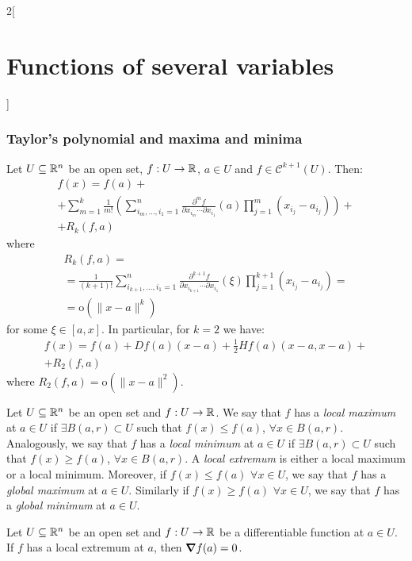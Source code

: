 \documentclass[../../../main.tex]{subfiles}
\begin{document}
\begin{multicols}{2}[\section{Functions of several variables}]
  \subsubsection{Taylor's polynomial and maxima and minima}
  \begin{theorem}
    Let $U\subseteq\mathbb{R}^n$ be an open set, $f:U\rightarrow\mathbb{R} $, $a\in U$ and $f\in \mathcal{C}^{k+1}(U)$. Then:
    \begin{multline*}
      f(x)=f(a)+\\+\sum_{m=1}^k\frac{1}{m!}\left(\sum_{i_m,\ldots,i_1=1}^n\frac{\partial^mf}{\partial x_{i_m}\cdots\partial x_{i_1}}(a)\prod_{j=1}^m(x_{i_j}-a_{i_j})\right)+\\+R_k(f,a)
    \end{multline*} where
    \begin{multline*}
      R_k(f,a)=\\=\frac{1}{(k+1)!}\sum_{i_{k+1},\ldots,i_1=1}^n\frac{\partial^{k+1}f}{\partial x_{i_{k+1}}\cdots\partial x_{i_1}}(\xi)\prod_{j=1}^{k+1}(x_{i_j}-a_{i_j})=\\=\text{o}(\|x-a\|^k)
    \end{multline*} for some $\xi\in[a,x]$. In particular, for $k=2$ we have:
    \begin{multline*}
      f(x)=f(a)+Df(a)(x-a)+\frac{1}{2}Hf(a)(x-a,x-a)+\\+R_2(f,a)
    \end{multline*} where $R_2(f,a)=\text{o}(\|x-a\|^2)$.
  \end{theorem}
  \begin{definition}
    Let $U\subseteq\mathbb{R}^n$ be an open set and $f:U\rightarrow\mathbb{R} $. We say that $f$ has a \emph{local maximum} at $a\in U$ if $\exists B(a,r)\subset U$ such that $f(x)\leq f(a)$, $\forall x\in B(a,r)$. Analogously, we say that $f$ has a \emph{local minimum} at $a\in U$ if $\exists B(a,r)\subset U$ such that $f(x)\geq f(a)$, $\forall x\in B(a,r)$. A \emph{local extremum} is either a local maximum or a local minimum. Moreover, if $f(x)\leq f(a)$ $\forall x\in U$, we say that $f$ has a \emph{global maximum} at $a\in U$. Similarly if $f(x)\geq f(a)$ $\forall x\in U$, we say that $f$ has a \emph{global minimum} at $a\in U$.
  \end{definition}
  \begin{proposition}
    Let $U\subseteq\mathbb{R}^n$ be an open set and $f:U\rightarrow\mathbb{R} $ be a differentiable function at $a\in U$. If $f$ has a local extremum at $a$, then $\grad f(a)=0$.
  \end{proposition}

\end{multicols}
\end{document}
